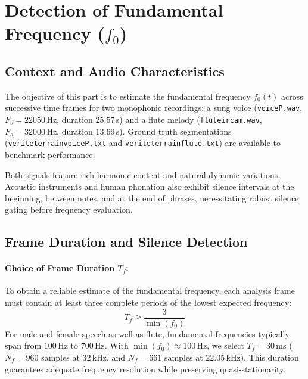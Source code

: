 \documentclass{rapportCS}
\begin{document}

\tabledematieres
\newpage


\section{Detection of Fundamental Frequency ($f_0$)}

\subsection{Context and Audio Characteristics}

The objective of this part is to estimate the fundamental frequency $f_0(t)$ across successive time frames for two monophonic recordings: a sung voice (\texttt{voiceP.wav}, $F_s = 22050$\,Hz, duration $25.57$\,s) and a flute melody (\texttt{fluteircam.wav}, $F_s = 32000$\,Hz, duration $13.69$\,s). Ground truth segmentations (\texttt{veriteterrainvoiceP.txt} and \texttt{veriteterrainflute.txt}) are available to benchmark performance.

Both signals feature rich harmonic content and natural dynamic variations. Acoustic instruments and human phonation also exhibit silence intervals at the beginning, between notes, and at the end of phrases, necessitating robust silence gating before frequency evaluation.

\subsection{Frame Duration and Silence Detection}

\paragraph{Choice of Frame Duration $T_f$:}
To obtain a reliable estimate of the fundamental frequency, each analysis frame must contain at least three complete periods of the lowest expected frequency:
\begin{equation}
    T_f \ge \frac{3}{\min(f_0)}
\end{equation}
For male and female speech as well as flute, fundamental frequencies typically span from $100$\,Hz to $700$\,Hz. With $\min(f_0) \approx 100$\,Hz, we select $T_f = 30$\,ms ($N_f = 960$ samples at $32$\,kHz, and $N_f = 661$ samples at $22.05$\,kHz). This duration guarantees adequate frequency resolution while preserving quasi-stationarity.
\end{document}
